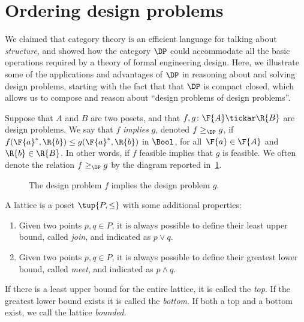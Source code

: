 \section{Ordering design problems}

We claimed that category theory is an efficient language for talking about \emph{structure}, and showed how the category $\DP$ could accommodate all the basic operations required by a theory of formal engineering design. Here, we illustrate some of the applications and advantages of $\DP$ in reasoning about and solving design problems, starting with the fact that that $\DP$ is compact closed, which allows us to compose and reason about ``design problems of design problems''.

\begin{definition}[Order on $\DP$]
\label{def:DP_loc_pos}

Suppose that $A$ and $B$ are two posets, and that $f,g \colon \F{A} \tickar \R{B}$ are design problems. We say that $f$ \emph{implies} $g$, denoted $f \geq_{\DP} g$, if $f(\F{a}^*,\R{b}) \leq g(\F{a}^*,\R{b} )$ in $\Bool$, for all~$\F{a} \in \F{A}$
and~$\R{b} \in \R{B}$. In other words, if $f$ feasible implies that $g$ is feasible. We often denote the relation $f \geq_{\DP} g$
by the diagram reported in~\cref{fig:dpimplies}.

\begin{figure}[h!]
\begin{center}
\end{center}
\caption{The design problem $f$ implies the design problem $g$. \label{fig:dpimplies}}
\end{figure}
\end{definition}


\begin{definition}[Lattice]
\label{def:lattice}
A lattice is a poset $\tup{P, \leq}$ with some additional properties:
\begin{enumerate}
    \item Given two points $p, q \in P$, it is always possible to define their least upper bound, called \emph{join}, and indicated as $p \vee q$.
    \item Given two points $p, q \in P$, it is always possible to define their greatest lower bound, called \emph{meet}, and indicated as $p \wedge q$.
\end{enumerate}
\end{definition}

If there is a least upper bound for the entire lattice, it is called
the \emph{top}. If the greatest lower bound exists it is called the \emph{bottom}. If both a top and a bottom exist, we call the lattice \emph{bounded}.


